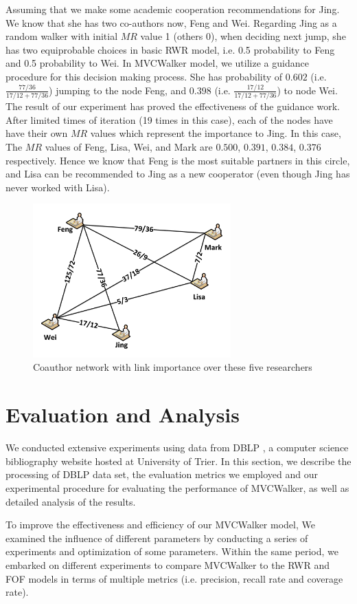 \documentclass[10pt,journal,compsoc]{IEEEtran}
\begin{document}
Assuming that we make some academic cooperation recommendations for Jing. We know that she has two co-authors now, Feng and Wei. Regarding Jing as a random walker with initial $MR$ value 1 (others 0), when deciding next jump, she has two equiprobable choices in basic RWR model, i.e. 0.5 probability to Feng and 0.5 probability to Wei. In MVCWalker model, we utilize a guidance procedure for this decision making process. She has probability of $0.602$ (i.e. $\frac{77/36}{17/12+77/36}$) jumping to the node Feng, and $0.398$ (i.e. $\frac{17/12}{17/12+77/36}$) to node Wei. The result of our experiment has proved the effectiveness of the guidance work. After limited times of iteration (19 times in this case), each of the nodes have have their own $MR$ values which represent the importance to Jing. In this case, The $MR$ values of Feng, Lisa, Wei, and Mark are $0.500$, $0.391$, $0.384$, $0.376$ respectively. Hence we know that Feng is the most suitable partners in this circle, and Lisa can be recommended to Jing as a new cooperator (even though Jing has never worked with Lisa).

\begin{figure}
\centering
\includegraphics [width=3in]{Fig-example.pdf}
\caption{Coauthor network with link importance over these five researchers}
\end{figure}

\section{Evaluation and Analysis}
We conducted extensive experiments using data from DBLP \cite{Ley:DBLP}, a computer science bibliography website hosted at University of Trier. In this section, we describe the processing of DBLP data set, the evaluation metrics we employed and our experimental procedure for evaluating the performance of MVCWalker, as well as detailed analysis of the results.

To improve the effectiveness and efficiency of our MVCWalker model, We examined the influence of different parameters by conducting a series of experiments and optimization of some parameters. Within the same period, we embarked on different experiments to compare MVCWalker to the RWR and FOF models in terms of multiple metrics (i.e. precision, recall rate and coverage rate).
\end{document}
